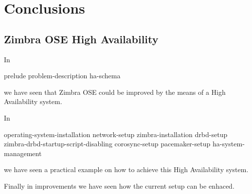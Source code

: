 

\chapter{Conclusions}
\label{chap:conclusions}

\section {Zimbra OSE High Availability}
In 

{prelude}
{problem-description}
{ha-schema}

we have seen that Zimbra OSE could be improved by the means of a High Availability system.

In 

{operating-system-installation}
{network-setup}
{zimbra-installation}
{drbd-setup}
{zimbra-drbd-startup-script-disabling}
{corosync-setup}
{pacemaker-setup}
{ha-system-management}

we have seen a practical example on how to achieve this High Availability system.

Finally in {improvements} we have seen how the current setup can be enhaced.




